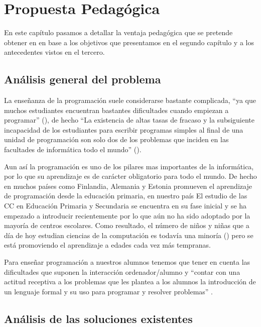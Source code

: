 \chapter{Propuesta Pedagógica}

En este capítulo pasamos a detallar la ventaja pedagógica que se pretende obtener en en base a los objetivos que presentamos en el segundo capítulo y a los antecedentes vistos en el tercero.

\section{Análisis general del problema}

La enseñanza de la programación suele considerarse bastante complicada, ``ya que muchos estudiantes encuentran bastantes dificultades cuando empiezan a programar'' (\cite{rubio_uso_2018}), de hecho ``La existencia de altas tasas de fracaso y la subsiguiente incapacidad de los estudiantes para escribir programas simples al final de una unidad de programación son solo dos de los problemas que inciden en las facultades de informática todo el mundo'' (\cite{bruce_contemporary_nodate}).

\bigskip
Aun así la programación es uno de los pilares mas importantes de la informática, por lo que su aprendizaje es de carácter obligatorio para todo el mundo. De hecho en muchos países como Finlandia, Alemania y Estonia promueven el aprendizaje de programación desde la educación primaria, en nuestro país El estudio de las CC en Educación Primaria y Secundaria se encuentra en su fase inicial y se ha
empezado a introducir recientemente por lo que aún no ha sido adoptado por la mayoría de centros escolares. Como resultado, el número de niños y niñas que a día de hoy estudian ciencias de la computación es
todavía una minoría (\cite{fecyt_educacion_2016}) pero se está promoviendo el aprendizaje a edades cada vez más tempranas.

\bigskip
Para enseñar programación a nuestros alumnos tenemos que tener en cuenta las dificultades que suponen la interacción ordenador/alumno y ``contar con una actitud receptiva a los problemas que les plantea a los alumnos la introducción de un lenguaje formal y su uso para programar y resolver problemas'' \cite{vitale_psycopedagogical_1990}.

\section{Análisis de las soluciones existentes}

